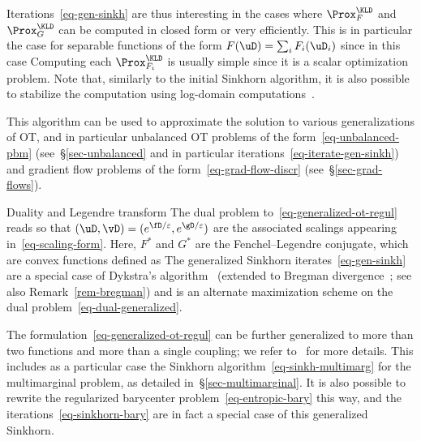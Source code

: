 Iterations~\eqref{eq-gen-sinkh} are thus interesting in the cases where $\Prox_{F}^{\KLD}$ and $\Prox_{G}^{\KLD}$ can be computed in closed form or very efficiently. This is in particular the case for separable functions of the form $F(\uD) = \sum_i F_i(\uD_i)$ since in this case
Computing each $\Prox_{F_i}^{\KLD}$ is usually simple since it is a scalar optimization problem.
%
Note that, similarly to the initial Sinkhorn algorithm, it is also possible to stabilize the computation using log-domain computations~\citep{2016-chizat-sinkhorn}.

This algorithm can be used to approximate the solution to various generalizations of OT, and in particular unbalanced OT problems of the form~\eqref{eq-unbalanced-pbm} (see~\S\ref{sec-unbalanced} and in particular iterations~\eqref{eq-iterate-gen-sinkh}) and gradient flow problems of the form~\eqref{eq-grad-flow-discr} (see~\S\ref{sec-grad-flows}).


\begin{rem1}{Duality and Legendre transform}
The dual problem to~\eqref{eq-generalized-ot-regul} reads
so that $(\uD,\vD) = (e^{\fD/\varepsilon},e^{\gD/\varepsilon})$ are the associated scalings appearing in~\eqref{eq-scaling-form}.
Here, $F^*$ and $G^*$ are the Fenchel--Legendre conjugate, which are convex functions defined as
%
The generalized Sinkhorn iterates~\eqref{eq-gen-sinkh} are a special case of Dykstra's algorithm~\citep{Dykstra83,Dykstra85} (extended to Bregman divergence~\citep{bauschke-lewis,CensorReich-Dykstra}; see also Remark~\ref{rem-bregman}) and is an alternate maximization scheme on the dual problem~\eqref{eq-dual-generalized}. 
\end{rem1}

The formulation~\eqref{eq-generalized-ot-regul} can be further generalized to more than two functions and more than a single coupling; we refer to~\citep{2016-chizat-sinkhorn} for more details. This includes as a particular case the Sinkhorn algorithm~\eqref{eq-sinkh-multimarg} for the multimarginal problem, as detailed in~\S\ref{sec-multimarginal}. 
%
It is also possible to rewrite the regularized barycenter problem~\eqref{eq-entropic-bary} this way, and the iterations~\eqref{eq-sinkhorn-bary} are in fact a special case of this generalized Sinkhorn.


